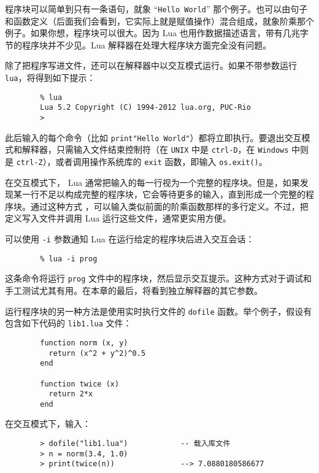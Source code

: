程序块可以简单到只有一条语句，就象 “\verb|Hello World|” 那个例子。也可以由句子和函数定义（后面我们会看到，它实际上就是赋值操作）混合组成，就象阶乘那个例子。如果你想，程序块可以很大。因为 Lua 也用作数据描述语言，带有几兆字节的程序块并不少见。Lua 解释器在处理大程序块方面完全没有问题。

除了把程序写进文件，还可以在解释器中以交互模式运行。如果不带参数运行 \verb|lua|，将得到如下提示：

\begin{verbatim}
        % lua  
        Lua 5.2 Copyright (C) 1994-2012 lua.org, PUC-Rio
        >
\end{verbatim}

此后输入的每个命令（比如 \verb|print"Hello World"|）都将立即执行。要退出交互模式和解释器，只需输入文件结束控制符（在 \verb|UNIX| 中是 \verb|ctrl-D|，在 \verb|Windows| 中则是 \verb|ctrl-Z|），或者调用操作系统库的 \verb|exit| 函数，即输入 \verb|os.exit()|。

在交互模式下， Lua 通常把输入的每一行视为一个完整的程序块。但是，如果发现某一行不足以构成完整的程序块，它会等待更多的输入，直到形成一个完整的程序块。通过这种方式 ，可以输入类似前面的阶乘函数那样的多行定义。不过，把定义写入文件并调用 Lua 运行这些文件，通常更实用方便。

可以使用 \verb|-i| 参数通知 Lua 在运行给定的程序块后进入交互会话：

\begin{verbatim}
        % lua -i prog
\end{verbatim}

这条命令将运行 \verb|prog| 文件中的程序块，然后显示交互提示。这种方式对于调试和手工测试尤其有用。在本章的最后，将看到独立解释器的其它参数。

运行程序块的另一种方法是使用实时执行文件的 \verb|dofile| 函数。举个例子，假设有包含如下代码的 \verb|lib1.lua| 文件：

\begin{verbatim}
        function norm (x, y)
          return (x^2 + y^2)^0.5
        end

        function twice (x)
          return 2*x
        end
\end{verbatim}

在交互模式下，输入：

\begin{verbatim}
        > dofile("lib1.lua")            -- 载入库文件
        > n = norm(3.4, 1.0)
        > print(twice(n))               --> 7.0880180586677
\end{verbatim}

